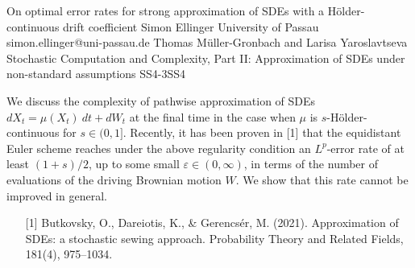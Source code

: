 \begin{talk}
  {On optimal error rates for strong approximation of SDEs with a H\"older-continuous drift coefficient}%
  {Simon Ellinger}%
  {University of Passau}%
  {simon.ellinger@uni-passau.de}%
  {Thomas M\"uller-Gronbach and Larisa Yaroslavtseva}%
{Stochastic Computation and Complexity, Part II: Approximation of SDEs under non-standard assumptions}
{}{SS4-3}{SS4}

			
We discuss the complexity of pathwise approximation of SDEs $dX_t = \mu(X_t) \: dt + dW_t$ at the final time in the case when $\mu$ is $s$-H\"older-continuous for $s \in (0,1]$. Recently, it has been proven in [1] that the equidistant Euler scheme reaches under the above regularity condition an $L^p$-error rate of at least $(1+s)/2$, up to some small $\varepsilon \in (0,\infty)$, in terms of the number of evaluations of the driving Brownian motion $W$. We show that this rate cannot be improved in general.

\medskip

\begin{enumerate}
	\item[{[1]}] Butkovsky, O., Dareiotis, K., \& Gerencsér, M. (2021). Approximation of SDEs: a stochastic sewing approach. Probability Theory and Related Fields, 181(4), 975–1034.
\end{enumerate}
\end{talk}

